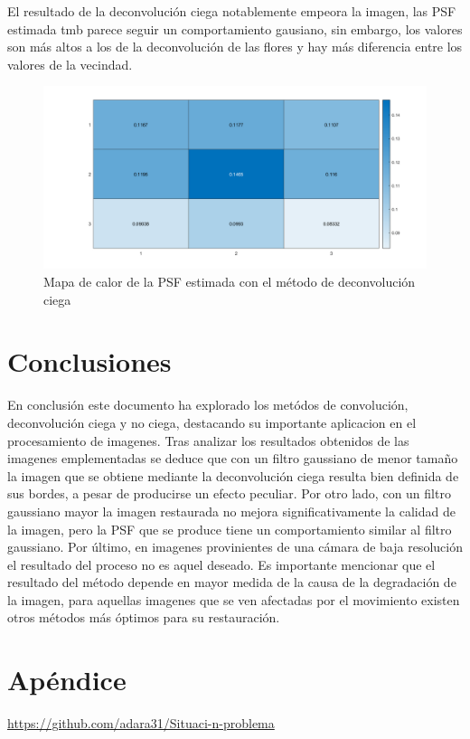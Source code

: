 \documentclass[eng]{ajceam-class}
\begin{document}
El resultado de la deconvolución ciega notablemente empeora la imagen, las PSF estimada tmb parece seguir un comportamiento gausiano, sin embargo, los valores son más altos a los de la deconvolución de las flores y hay más diferencia entre los valores de la vecindad. 

\begin{figure}[!h] 
 \centering
 \includegraphics[width=.7\columnwidth]{PSF_estimada_2.png} 
 \caption{Mapa de calor de la PSF estimada con el método de deconvolución ciega} \label{fig-1}
\end{figure}

\bigskip



\section{Conclusiones}

En conclusión este documento ha explorado los metódos de convolución, deconvolución ciega y no ciega, destacando su importante aplicacion en el procesamiento de imagenes. Tras analizar los resultados obtenidos de las imagenes emplementadas se deduce que con un filtro gaussiano de menor tamaño la imagen que se obtiene mediante la deconvolución ciega resulta bien definida de sus bordes, a pesar de producirse un efecto peculiar. Por otro lado, con un filtro gaussiano mayor la imagen restaurada no mejora significativamente la calidad de la imagen, pero la PSF que se produce tiene un comportamiento similar al filtro gaussiano. Por último, en imagenes provinientes de una cámara de baja resolución el resultado del proceso no es aquel deseado. Es importante mencionar que el resultado del método depende en mayor medida de la causa de la degradación de la imagen, para aquellas imagenes que se ven afectadas por el movimiento existen otros métodos más óptimos para su restauración. 

\section{Apéndice}
\url{https://github.com/adara31/Situaci-n-problema}





\end{document}
